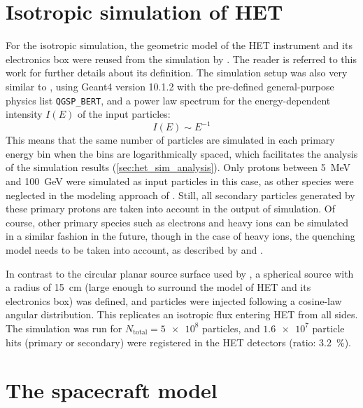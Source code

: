 \section{Isotropic simulation of HET}
\label{sec:isotropic_sim}

For the isotropic simulation, the geometric model of the \ac{HET} instrument and its electronics box were reused from the simulation by \citet{Elftmann-2020-PhD}. The reader is referred to this work for further details about its definition. The simulation setup was also very similar to \citet{Elftmann-2020-PhD}, using \ac{Geant4} version 10.1.2 with the pre-defined general-purpose physics list \texttt{QGSP\_BERT}, and a power law spectrum for the energy-dependent intensity $I(E)$ of the input particles:
\begin{equation}
I(E) \sim E^{-1}
\label{eq:het_g4_spectrum}
\end{equation}
This means that the same number of particles are simulated in each primary energy bin when the bins are logarithmically spaced, which facilitates the analysis of the simulation results (\autoref{sec:het_sim_analysis}). Only protons between \SI{5}{\mega\electronvolt} and \SI{100}{\giga\electronvolt} were simulated as input particles in this case, as other species were neglected in the modeling approach of \citet{Forstner-2021-SolO}. Still, all secondary particles generated by these primary protons are taken into account in the output of simulation. Of course, other primary species such as electrons and heavy ions can be simulated in a similar fashion in the future, though in the case of heavy ions, the quenching model needs to be taken into account, as described by \citet[Section 5.4]{Elftmann-2020-PhD} and \citet{Tammen-2015}.

In contrast to the circular planar source surface used by \citet{Elftmann-2020-PhD}, a spherical source with a radius of \SI{15}{\centi\meter} (large enough to surround the model of \ac{HET} and its electronics box) was defined, and particles were injected following a cosine-law angular distribution. This replicates an isotropic flux entering \ac{HET} from all sides.
The simulation was run for $N_\text{total} = \num{5e8}$ particles, and $\num{1.6e7}$ particle hits (primary or secondary) were registered in the \ac{HET} detectors (ratio: \SI{3.2}{\percent}).

\section{The spacecraft model}
\label{sec:spacecraft_model}

